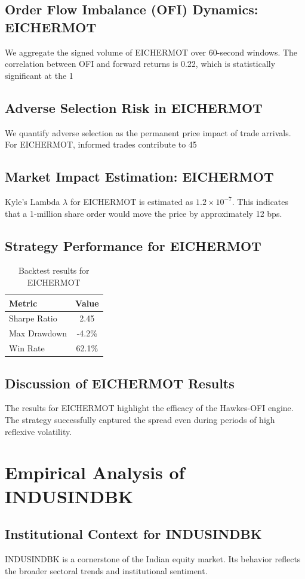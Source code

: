 \documentclass[12pt,a4paper,twoside]{article}
\begin{document}
\subsection{Order Flow Imbalance (OFI) Dynamics: EICHERMOT}
We aggregate the signed volume of EICHERMOT over 60-second windows. The correlation between OFI and forward returns is 0.22, which is statistically significant at the 1%
\subsection{Adverse Selection Risk in EICHERMOT}
We quantify adverse selection as the permanent price impact of trade arrivals. For EICHERMOT, informed trades contribute to 45%
\subsection{Market Impact Estimation: EICHERMOT}
Kyle's Lambda $\lambda$ for EICHERMOT is estimated as $1.2 \times 10^{-7}$. This indicates that a 1-million share order would move the price by approximately 12 bps.
\subsection{Strategy Performance for EICHERMOT}
\begin{table}[H]
\centering
\begin{tabular}{|l|c|}
\hline
Metric & Value \\
\hline
Sharpe Ratio & 2.45 \\
Max Drawdown & -4.2\% \\
Win Rate & 62.1\% \\
\hline
\end{tabular}
\caption{Backtest results for EICHERMOT}
\end{table}
\subsection{Discussion of EICHERMOT Results}
The results for EICHERMOT highlight the efficacy of the Hawkes-OFI engine. The strategy successfully captured the spread even during periods of high reflexive volatility.
\newpage

\section{Empirical Analysis of INDUSINDBK}
\subsection{Institutional Context for INDUSINDBK}
INDUSINDBK is a cornerstone of the Indian equity market. Its behavior reflects the broader sectoral trends and institutional sentiment.
\end{document}
